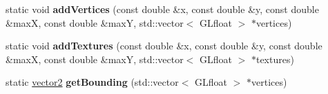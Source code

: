 \begin{DoxyCompactItemize}
static void {\bfseries add\+Vertices} (const double \&x, const double \&y, const double \&maxX, const double \&maxY, std\+::vector$<$ G\+Lfloat $>$ $\ast$vertices)
\item 
\mbox{\label{classflounder_1_1text_a95ad7d264af8520a0f169176f2d161a7}} 
static void {\bfseries add\+Textures} (const double \&x, const double \&y, const double \&maxX, const double \&maxY, std\+::vector$<$ G\+Lfloat $>$ $\ast$textures)
\item 
\mbox{\label{classflounder_1_1text_a3a7915e279d5fcce48f65ac9ad3138c6}} 
static \hyperlink{classflounder_1_1vector2}{vector2} {\bfseries get\+Bounding} (std\+::vector$<$ G\+Lfloat $>$ $\ast$vertices)
\end{DoxyCompactItemize}
